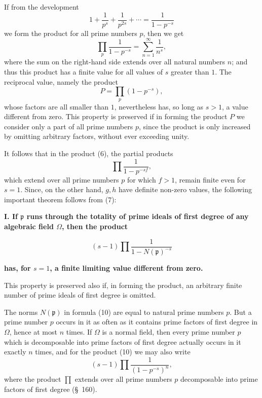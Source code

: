 \documentclass[11pt]{article}
\begin{document}
If from the development
\[
1+\frac1{p^s}+\frac1{p^{2s}}+\cdots=\frac1{1-p^{-s}}
\]
we form the product for all prime numbers $p$, then we get
\begin{equation}
\prod_p\frac1{1-p^{-s}}=\sum_{n=1}^{\infty}\frac1{n^s},
\tag{8}
\end{equation}
where the sum on the right-hand side extends over all natural numbers $n$; and thus this product has a finite value for all values of $s$ greater than $1$. The reciprocal value, namely the product
\begin{equation}
P=\prod_p(1-p^{-s}),
\tag{9}
\end{equation}
whose factors are all smaller than $1$, nevertheless has, so long as $s>1$, a value different from zero. This property is preserved if in forming the product $P$ we consider only a part of all prime numbers $p$, since the product is only increased by omitting arbitrary factors, without ever exceeding unity.

It follows that in the product (6), the partial products
\[
\prod\frac1{1-p^{-sf}},
\]
which extend over all prime numbers $p$ for which $f>1$, remain finite even for $s=1$. Since, on the other hand, $g,h$ have definite non-zero values, the following important theorem follows from (7):

\begin{center}
\textbf{I. If $\mathfrak p$ runs through the totality of prime ideals of first degree of any algebraic field $\Omega$, then the product}
\end{center}
\begin{equation}
(s-1)\prod\frac1{1-N(\mathfrak p)^{-s}}
\tag{10}
\end{equation}
\begin{center}
\textbf{has, for $s=1$, a finite limiting value different from zero.}
\end{center}

This property is preserved also if, in forming the product, an arbitrary finite number of prime ideals of first degree is omitted.

The norms $N(\mathfrak p)$ in formula (10) are equal to natural prime numbers $p$. But a prime number $p$ occurs in it as often as it contains prime factors of first degree in $\Omega$, hence at most $n$ times. If $\Omega$ is a normal field, then every prime number $p$ which is decomposable into prime factors of first degree actually occurs in it exactly $n$ times, and for the product (10) we may also write
\[
(s-1)\prod\frac1{(1-p^{-s})^n},
\]
where the product $\prod$ extends over all prime numbers $p$ decomposable into prime factors of first degree (\S~160).
\end{document}

